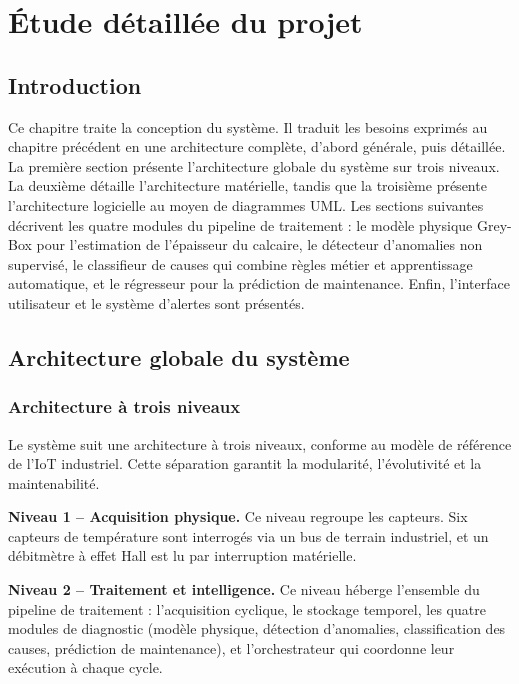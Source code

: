 \chapter{Étude détaillée du projet}
\newpage

\section*{Introduction}

Ce chapitre traite la conception du système. Il traduit les besoins exprimés au chapitre précédent en une architecture complète, d'abord générale, puis détaillée. La première section présente l'architecture globale du système sur trois niveaux. La deuxième détaille l'architecture matérielle, tandis que la troisième présente l'architecture logicielle au moyen de diagrammes UML. Les sections suivantes décrivent les quatre modules du pipeline de traitement : le modèle physique Grey-Box pour l'estimation de l'épaisseur du calcaire, le détecteur d'anomalies non supervisé, le classifieur de causes qui combine règles métier et apprentissage automatique, et le régresseur pour la prédiction de maintenance. Enfin, l'interface utilisateur et le système d'alertes sont présentés.

\section{Architecture globale du système}

\subsection{Architecture à trois niveaux}

Le système suit une architecture à trois niveaux, conforme au modèle de référence de l'IoT industriel. Cette séparation garantit la modularité, l'évolutivité et la maintenabilité.

\textbf{Niveau 1 -- Acquisition physique.} Ce niveau regroupe les capteurs. Six capteurs de température sont interrogés via un bus de terrain industriel, et un débitmètre à effet Hall est lu par interruption matérielle.

\textbf{Niveau 2 -- Traitement et intelligence.} Ce niveau héberge l'ensemble du pipeline de traitement : l'acquisition cyclique, le stockage temporel, les quatre modules de diagnostic (modèle physique, détection d'anomalies, classification des causes, prédiction de maintenance), et l'orchestrateur qui coordonne leur exécution à chaque cycle.

